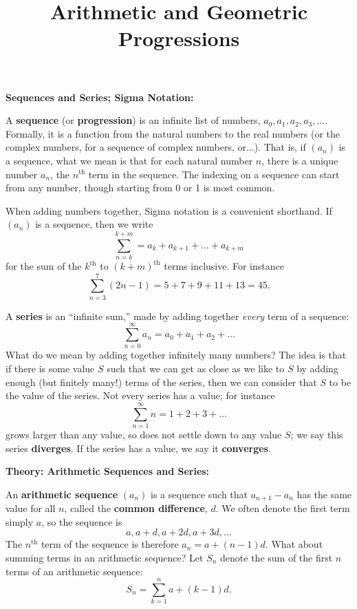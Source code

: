 \documentclass{article}
\begin{document}
\title{Arithmetic and Geometric Progressions}
\date{}

\maketitle
\thispagestyle{empty}

\Large




\textbf{Sequences and Series; Sigma Notation:}\bigskip


A \textbf{sequence} (or \textbf{progression}) is an infinite list of numbers, $a_0, a_1, a_2,a_3,\hdots$. Formally, it is a function from the natural numbers to the real numbers (or the complex numbers, for a sequence of complex numbers, or...). That is, if $(a_n)$ is a sequence, what we mean is that for each natural number $n$, there is a unique number $a_n$, the $n^\mathrm{th}$ term in the sequence. The indexing on a sequence can start from any number, though starting from 0 or 1 is most common.

When adding numbers together, Sigma notation is a convenient shorthand. If $(a_n)$ is a sequence, then we write
\[\sum_{n=k}^{k+m} = a_k+a_{k+1}+\hdots+a_{k+m}\]
for the sum of the $k^\mathrm{th}$ to $(k+m)^\mathrm{th}$ terms inclusive. For instance
\[\sum_{n=3}^7 \left(2n-1\right) = 5 + 7 + 9 + 11 + 13 = 45.\]

A \textbf{series} is an ``infinite sum,'' made by adding together \textit{every} term of a sequence:
\[\sum_{n=0}^\infty a_n = a_0+a_1+a_2+\hdots\]
What do we mean by adding together infinitely many numbers? The idea is that if there is some value $S$ such that we can get as close as we like to $S$ by adding enough (but finitely many!) terms of the series, then we can consider that $S$ to be the value of the series. Not every series has a value; for instance
\[\sum_{n=1}^\infty n = 1+2+3+\hdots\]
grows larger than any value, so does not settle down to any value $S$; we say this series \textbf{diverges}. If the series has a value, we say it \textbf{converges}.






\clearpage

\textbf{Theory: Arithmetic Sequences and Series:}\bigskip


An \textbf{arithmetic sequence} $(a_n)$ is a sequence such that $a_{n+1}-a_n$ has the same value for all $n$, called the \textbf{common difference}, $d$. We often denote the first term simply $a$, so the sequence is
\[a, a+d, a+2d, a+3d,\hdots\]
The $n^\mathrm{th}$ term of the sequence is therefore $a_n=a+(n-1)d$. What about summing terms in an arithmetic sequence? Let $S_n$ denote the sum of the first $n$ terms of an arithmetic sequence:
\[S_n = \sum_{k=1}^n a+(k-1)d.\]
\end{document}
